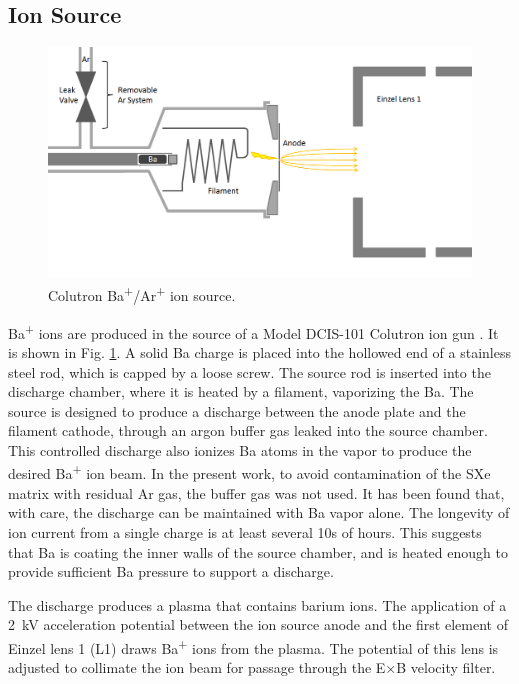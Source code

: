 \subsection{Ion Source}

\begin{figure} %
        \centering
                \includegraphics[width=.95\textwidth]{figures/ionSource.png}
                \caption{Colutron Ba\textsuperscript{+}/Ar\textsuperscript{+} ion source.}
\label{fig:ionsource}
\end{figure}

Ba\textsuperscript{+} ions are produced in the source of a Model DCIS-101 Colutron ion gun \cite{Colutron}.  It is shown in Fig. \ref{fig:ionsource}.  A solid Ba charge is placed into the hollowed end of a stainless steel rod, which is capped by a loose screw.  The source rod is inserted into the discharge chamber, where it is heated by a filament, vaporizing the Ba.  The source is designed to produce a discharge between the anode plate and the filament cathode, through an argon buffer gas leaked into the source chamber.  This controlled discharge also ionizes Ba atoms in the vapor to produce the desired Ba\textsuperscript{+} ion beam.  In the present work, to avoid contamination of the SXe matrix with residual Ar gas, the buffer gas was not used.  It has been found that, with care, the discharge can be maintained with Ba vapor alone.  The longevity of ion current from a single charge is at least several 10s of hours.  This suggests that Ba is coating the inner walls of the source chamber, and is heated enough to provide sufficient Ba pressure to support a discharge.

The discharge produces a plasma that contains barium ions.  The application of a 2~kV acceleration potential between the ion source anode and the first element of Einzel lens 1 (L1) draws Ba\textsuperscript{+} ions from the plasma.  The potential of this lens is adjusted to collimate the ion beam for passage through the E$\times$B velocity filter.

